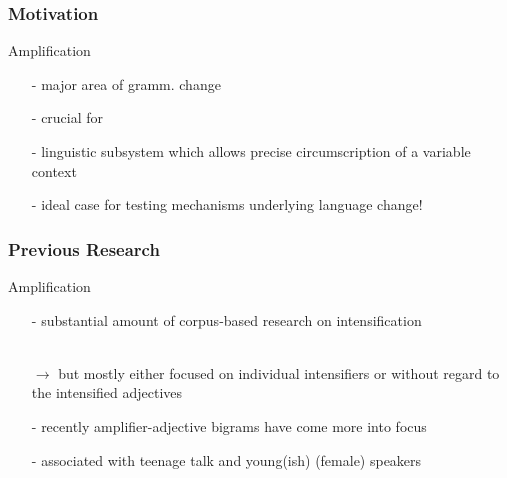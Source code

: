 \documentclass[12pt, table]{beamer}
\begin{document}
\begin{frame}
\frametitle{Motivation}
Amplification
\begin{itemize}
\item[-] major area of gramm. change \textcolor{gray}{\begin{scriptsize}\citep[cf.][441]{brinton2006englishlanguage}\end{scriptsize}}
\item[-] crucial for  \textcolor{gray}{\begin{scriptsize}\citep[258]{ito2003well}\end{scriptsize}}
\item[-] linguistic subsystem which allows precise circumscription of a variable context \textcolor{gray}{\begin{scriptsize}\citep[49]{labov1972sociolinguistic, labov1966social}\end{scriptsize}}
\item[-] ideal case for testing mechanisms underlying language change!
\end{itemize}
\end{frame}

\begin{frame}
\frametitle{Previous Research}
Amplification
\begin{itemize}
\item[-] substantial amount of corpus-based research on intensification \textcolor{gray}{\begin{scriptsize}\citep[e.g][]{aijmer2011totally, aijmer2018well, fuchs2016register, fuchs2017women, nunez2014absolutely,palacios2012absolutely}\end{scriptsize}} \\
$\rightarrow$ but mostly either focused on individual intensifiers or without regard to the intensified adjectives
\item[-] recently amplifier-adjective bigrams have come more into focus \textcolor{gray}{\begin{scriptsize}\citep[e.g.][]{schweinberger2017adjectiveintensifiers, wagner2017icame, wagner2017totally}
\end{scriptsize}} 
\item[-] associated with teenage talk and young(ish) (female) speakers \\\textcolor{gray}{\begin{scriptsize}\citep{bauer2002adjective, darcy2015stability, macaulay2006pure, tagliamonte2006so, tagliamonte2008intensifiers}\end{scriptsize}}
\end{itemize}
\end{frame}
\end{document}
